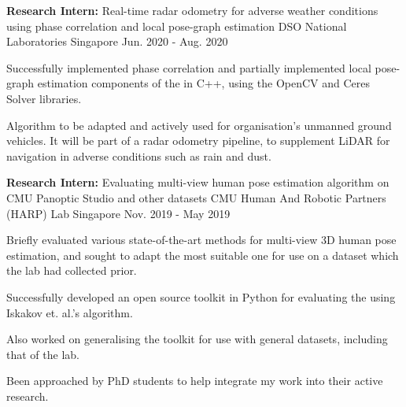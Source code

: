 \begin{cventries}

\label{radarOdometry}

\cventry
{
	\textbf{Research Intern:} Real-time radar odometry for adverse weather conditions using phase correlation and local pose-graph estimation
} %
{DSO National Laboratories} %
{Singapore} %
{Jun. 2020 - Aug. 2020} %
{ %
	\begin{cvitems}
		\item { Successfully implemented phase correlation and partially implemented local pose-graph estimation components of the  in C++, using the OpenCV and Ceres Solver libraries.}
		\item { Algorithm to be adapted and actively used for organisation's unmanned ground vehicles. It will be part of a radar odometry pipeline, to supplement LiDAR for navigation in adverse conditions such as rain and dust. }
	\end{cvitems}
}


\label{computerVisionProjectCMU}

\cventry
{
	\textbf{Research Intern:}  Evaluating multi-view human pose estimation algorithm on CMU Panoptic Studio and other datasets  \githubButton{learnable-triangulation-pytorch}
} %
{CMU Human And Robotic Partners (HARP) Lab} %
{Singapore} %
{Nov. 2019 - May 2019} %
{ %
	\begin{cvitems}
		\item { Briefly evaluated various state-of-the-art methods for multi-view 3D human pose estimation, and sought to adapt the most suitable one for use on a dataset which the lab had collected prior.}
		\item { Successfully developed an open source toolkit in Python for evaluating the  using Iskakov et. al.'s   algorithm.}
		\item { Also worked on generalising the toolkit for use with general datasets, including that of the lab.}
        \item { Been approached by PhD students to help integrate my work into their active research. }
	\end{cvitems}
}


\end{cventries}
